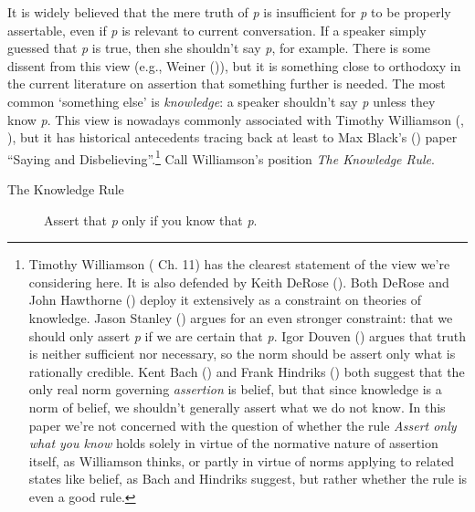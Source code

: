 \documentclass[
  10pt,
  letterpaper,
  DIV=11,
  numbers=noendperiod,
  twoside]{scrartcl}
\begin{document}
It is widely believed that the mere truth of \emph{p} is insufficient
for \emph{p} to be properly assertable, even if \emph{p} is relevant to
current conversation. If a speaker simply guessed that \emph{p} is true,
then she shouldn't say \emph{p}, for example. There is some dissent from
this view (e.g., Weiner ()), but it is
something close to orthodoxy in the current literature on assertion that
something further is needed. The most common `something else' is
\emph{knowledge}: a speaker shouldn't say \emph{p} unless they know
\emph{p}. This view is nowadays commonly associated with Timothy
Williamson (,
), but it has historical
antecedents tracing back at least to Max Black's
() paper ``Saying and
Disbelieving''.\footnote{Timothy Williamson
  ( Ch. 11) has the
  clearest statement of the view we're considering here. It is also
  defended by Keith DeRose (). Both
  DeRose and John Hawthorne () deploy
  it extensively as a constraint on theories of knowledge. Jason Stanley
  () argues for an even stronger
  constraint: that we should only assert \emph{p} if we are certain that
  \emph{p}. Igor Douven () argues that
  truth is neither sufficient nor necessary, so the norm should be
  assert only what is rationally credible. Kent Bach
  () and Frank Hindriks
  () both suggest that the only real
  norm governing \emph{assertion} is belief, but that since knowledge is
  a norm of belief, we shouldn't generally assert what we do not know.
  In this paper we're not concerned with the question of whether the
  rule \emph{Assert only what you know} holds solely in virtue of the
  normative nature of assertion itself, as Williamson thinks, or partly
  in virtue of norms applying to related states like belief, as Bach and
  Hindriks suggest, but rather whether the rule is even a good rule.}
Call Williamson's position \emph{The Knowledge Rule}.

\begin{description}
\item[The Knowledge Rule]
Assert that \emph{p} only if you know that \emph{p}.
\end{description}
\end{document}
